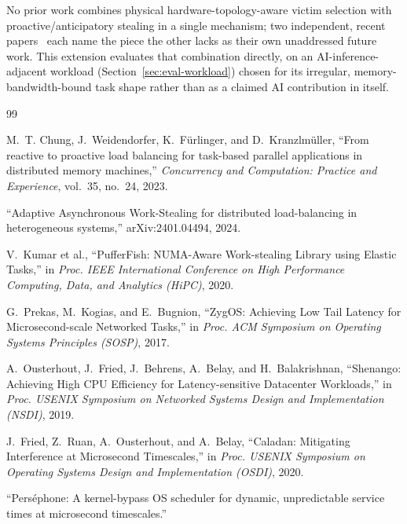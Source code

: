 No prior work combines physical hardware-topology-aware victim selection
with proactive/anticipatory stealing in a single mechanism; two
independent, recent papers~\cite{chung2023reactive,a2ws2024} each name the
piece the other lacks as their own unaddressed future work. This
extension evaluates that combination directly, on an AI-inference-adjacent
workload (Section~\ref{sec:eval-workload}) chosen for its irregular,
memory-bandwidth-bound task shape rather than as a claimed AI contribution
in itself.


\begin{thebibliography}{99}

M.~T. Chung, J.~Weidendorfer, K.~F\"{u}rlinger, and D.~Kranzlm\"{u}ller,
``From reactive to proactive load balancing for task-based parallel
applications in distributed memory machines,''
\emph{Concurrency and Computation: Practice and Experience}, vol.~35,
no.~24, 2023.

``Adaptive Asynchronous Work-Stealing for distributed load-balancing in
heterogeneous systems,'' arXiv:2401.04494, 2024.

V.~Kumar et al., ``PufferFish: NUMA-Aware Work-stealing Library using
Elastic Tasks,'' in \emph{Proc. IEEE International Conference on High
Performance Computing, Data, and Analytics (HiPC)}, 2020.

G.~Prekas, M.~Kogias, and E.~Bugnion, ``ZygOS: Achieving Low Tail Latency
for Microsecond-scale Networked Tasks,'' in \emph{Proc. ACM Symposium on
Operating Systems Principles (SOSP)}, 2017.

A.~Ousterhout, J.~Fried, J.~Behrens, A.~Belay, and H.~Balakrishnan,
``Shenango: Achieving High CPU Efficiency for Latency-sensitive Datacenter
Workloads,'' in \emph{Proc. USENIX Symposium on Networked Systems Design
and Implementation (NSDI)}, 2019.

J.~Fried, Z.~Ruan, A.~Ousterhout, and A.~Belay, ``Caladan: Mitigating
Interference at Microsecond Timescales,'' in \emph{Proc. USENIX Symposium
on Operating Systems Design and Implementation (OSDI)}, 2020.

``Pers\'{e}phone: A kernel-bypass OS scheduler for dynamic, unpredictable
service times at microsecond timescales.''

\end{thebibliography}

